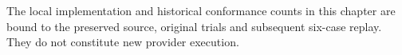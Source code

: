 


\par The local implementation and historical conformance counts in this chapter are bound to the preserved source, original trials and subsequent six-case replay. They do not constitute new provider execution. \citep{exec14_l6_local}
\label{exec14:l6-end}
